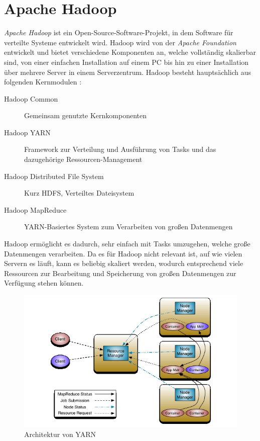 \section{Apache Hadoop}\label{sec:hadoop}

\emph{Apache Hadoop} ist ein Open-Source-Software-Projekt, in dem Software für verteilte Systeme entwickelt wird. Hadoop wird von der \emph{Apache Foundation} entwickelt und bietet verschiedene Komponenten an, welche vollständig skalierbar sind, von einer einfachen Installation auf einem PC bis hin zu einer Installation über mehrere Server in einem Serverzentrum. Hadoop besteht hauptsächlich aus folgenden Kernmodulen \cite{HadoopHomePage}:

\begin{description}
	\item[Hadoop Common] Gemeinsam genutzte Kernkomponenten
	\item[Hadoop YARN] Framework zur Verteilung und Ausführung von Tasks und das dazugehörige Ressourcen-Management
	\item[Hadoop Distributed File System] Kurz HDFS, Verteiltes Dateisystem
	\item[Hadoop MapReduce] YARN-Basiertes System zum Verarbeiten von großen Datenmengen
\end{description}

Hadoop ermöglicht es dadurch, sehr einfach mit Tasks umzugehen, welche große Datenmengen verarbeiten. Da es für Hadoop nicht relevant ist, auf wie vielen Servern es läuft, kann es beliebig skaliert werden, wodurch entsprechend viele Ressourcen zur Bearbeitung und Speicherung von großen Datenmengen zur Verfügung stehen können.

\begin{figure}
	\centering
	\includegraphics[width=\columnwidth]{./images/yarn_architecture.png}
	\caption[Architektur von YARN]{Architektur von YARN \cite{HadoopYarnArch271}}
	\label{fig:yarnarch}
\end{figure}

